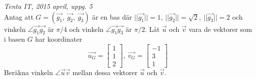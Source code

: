 {\it Tenta IT, 2015 april, uppg. 5}\\
Antag att $G=(\vec{g_1},\ \vec{g_2},\ \vec{g_3})$ är en bas där $||\vec{g_1}||=1,\ ||\vec{g_2}||=\sqrt{2},\ ||\vec{g_3}||=2$ och vinkeln $\angle\vec{g_1}\vec{g_2}$ är $\pi/4$ och vinkeln $\angle\vec{g_1}\vec{g_3}$ är $\pi/2$. Låt $\vec{u}$ och $\vec{v}$ vara de vektorer som i basen $G$ har koordinater
$$\vec{u_G}=\begin{bmatrix}1\\1\\2\end{bmatrix},\ \vec{v_G}=\begin{bmatrix}-1\\3\\1\end{bmatrix}$$
Beräkna vinkeln $\angle\vec{u}\vec{v}$ mellan dessa vektorer $\vec{u}$ och $\vec{v}$.
